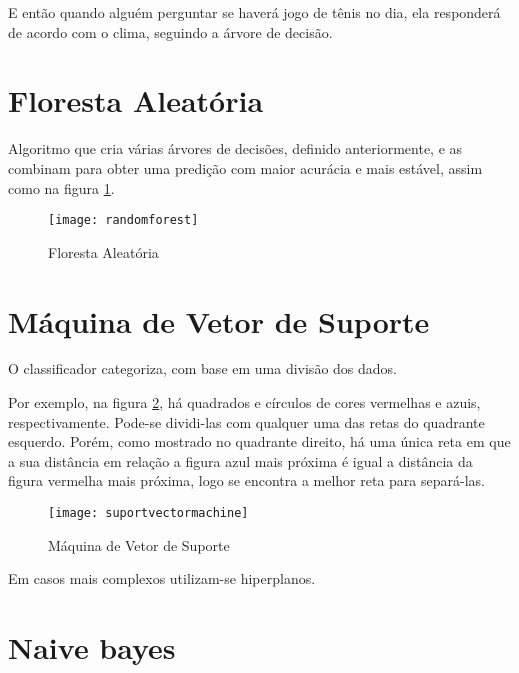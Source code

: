 E então quando alguém perguntar se haverá jogo de tênis no dia, ela responderá de acordo com o clima, seguindo a árvore de decisão.

\section{\textbf{Floresta Aleatória}}

Algoritmo que cria várias árvores de decisões,
definido anteriormente, e as combinam para obter uma predição com maior acurácia e mais estável, assim como na figura \ref{fig:randomforest}.



\begin{figure}[!htb]
\begin{center}
\caption{Floresta Aleatória}
\texttt{[image: randomforest]}
\label{fig:randomforest}
\end{center}
\end{figure}


\section{\textbf{Máquina de Vetor de Suporte}}

O classificador categoriza, com base em uma divisão dos dados. 

Por exemplo, na figura \ref{fig:suportvectormachine}, há quadrados e círculos de cores vermelhas e azuis, respectivamente.
Pode-se dividi-las com qualquer uma das retas do quadrante esquerdo.
Porém, como mostrado no quadrante direito,
há uma única reta em que a sua distância em relação a figura azul mais próxima é igual a distância da figura vermelha mais próxima,
logo se encontra a melhor reta para separá-las.


\begin{figure}[!htb]
\begin{center}
\caption{Máquina de Vetor de Suporte}
\texttt{[image: suportvectormachine]}
\label{fig:suportvectormachine}
\end{center}
\end{figure}

Em casos mais complexos utilizam-se hiperplanos.

\section{\textbf{Naive bayes}}

